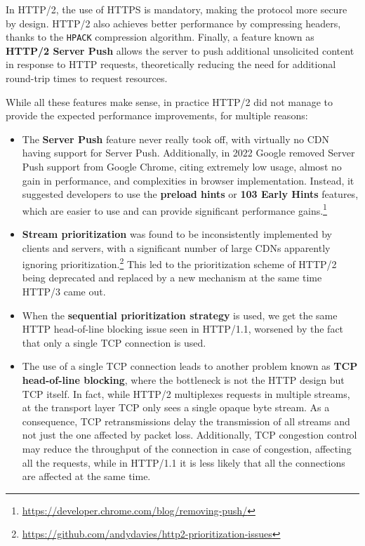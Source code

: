 
In HTTP/2, the use of HTTPS is mandatory, making the protocol more secure by design. HTTP/2 also achieves better performance by compressing headers, thanks to the \texttt{HPACK} compression algorithm. Finally, a feature known as \textbf{HTTP/2 Server Push} allows the server to push additional unsolicited content in response to HTTP requests, theoretically reducing the need for additional round-trip times to request resources.

While all these features make sense, in practice HTTP/2 did not manage to provide the expected performance improvements, for multiple reasons:

\begin{itemize}
    \item The \textbf{Server Push} feature never really took off, with virtually no CDN having support for Server Push. Additionally, in 2022 Google removed Server Push support from Google Chrome, citing extremely low usage, almost no gain in performance, and complexities in browser implementation. Instead, it suggested developers to use the \textbf{preload hints} or \textbf{103 Early Hints} features, which are easier to use and can provide significant performance gains.\footnote{\url{https://developer.chrome.com/blog/removing-push/}}
    \item \textbf{Stream prioritization} was found to be inconsistently implemented by clients and servers, with a significant number of large CDNs apparently ignoring prioritization.\footnote{\url{https://github.com/andydavies/http2-prioritization-issues}} This led to the prioritization scheme of HTTP/2 being deprecated and replaced by a new mechanism at the same time HTTP/3 came out.
    \item When the \textbf{sequential prioritization strategy} is used, we get the same HTTP head-of-line blocking issue seen in HTTP/1.1, worsened by the fact that only a single TCP connection is used.
    \item The use of a single TCP connection leads to another problem known as \textbf{TCP head-of-line blocking}, where the bottleneck is not the HTTP design but TCP itself. In fact, while HTTP/2 multiplexes requests in multiple streams, at the transport layer TCP only sees a single opaque byte stream. As a consequence, TCP retransmissions delay the transmission of all streams and not just the one affected by packet loss. Additionally, TCP congestion control may reduce the throughput of the connection in case of congestion, affecting all the requests, while in HTTP/1.1 it is less likely that all the connections are affected at the same time.
\end{itemize}

